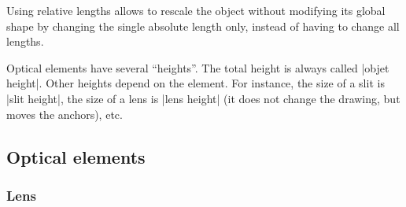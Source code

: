 \documentclass[a4paper]{ltxdoc}
\begin{document}
Using relative lengths allows to rescale the object without modifying its global shape by changing the single absolute length only, instead of having to change all lengths.

Optical elements have several \enquote{heights}. The total height is always called |objet height|. Other heights depend on the element. For instance, the size of a slit is |slit height|, the size of a lens is |lens height| (it does not change the drawing, but moves the anchors), etc.


\subsection{Optical elements}

\subsubsection{Lens}
\end{document}
